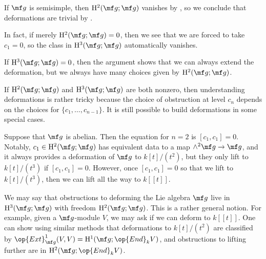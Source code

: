 \documentclass[../notes.tex]{subfiles}
\begin{document}
\begin{example}
	If $\mf g$ is semisimple, then $\mathrm H^2(\mf g;\mf g)$ vanishes by , so we conclude that deformations are trivial by .
\end{example}
\begin{remark}
	In fact, if merely $\mathrm H^2(\mf g;\mf g)=0$, then we see that we are forced to take $c_1=0$, so the class in $\mathrm H^3(\mf g;\mf g)$ automatically vanishes.
\end{remark}
\begin{remark}
	If $\mathrm H^3(\mf g;\mf g)=0$, then the argument shows that we can always extend the deformation, but we always have many choices given by $\mathrm H^2(\mf g;\mf g)$.
\end{remark}
\begin{remark}
	If $\mathrm H^2(\mf g;\mf g)$ and $\mathrm H^3(\mf g;\mf g)$ are both nonzero, then understanding deformations is rather tricky because the choice of obstruction at level $c_n$ depends on the choices for $\{c_1,\ldots,c_{n-1}\}$. It is still possible to build deformations in some special cases.
\end{remark}
\begin{example}
	Suppose that $\mf g$ is abelian. Then the equation for $n=2$ is $[c_1,c_1]=0$. Notably, $c_1\in\mathrm H^2(\mf g;\mf g)$ has equivalent data to a map $\land^2\mf g\to\mf g$, and it always provides a deformation of $\mf g$ to $k[t]/\left(t^2\right)$, but they only lift to $k[t]/\left(t^3\right)$ if $[c_1,c_1]=0$. However, once $[c_1,c_1]=0$ so that we lift to $k[t]/\left(t^3\right)$, then we can lift all the way to $k[[t]]$.
\end{example}
\begin{remark}
	We may say that obstructions to deforming the Lie algebra $\mf g$ live in $\mathrm H^3(\mf g;\mf g)$ with freedom $\mathrm H^2(\mf g;\mf g)$. This is a rather general notion. For example, given a $\mf g$-module $V$, we may ask if we can deform to $k[[t]]$. One can show using similar methods that deformations to $k[t]/\left(t^2\right)$ are classified by $\op{Ext}^1_{\mf g}(V,V)=\mathrm H^1(\mf g;\op{End}_kV)$, and obstructions to lifting further are in $\mathrm H^2(\mf g;\op{End}_kV)$.
\end{remark}
\end{document}
